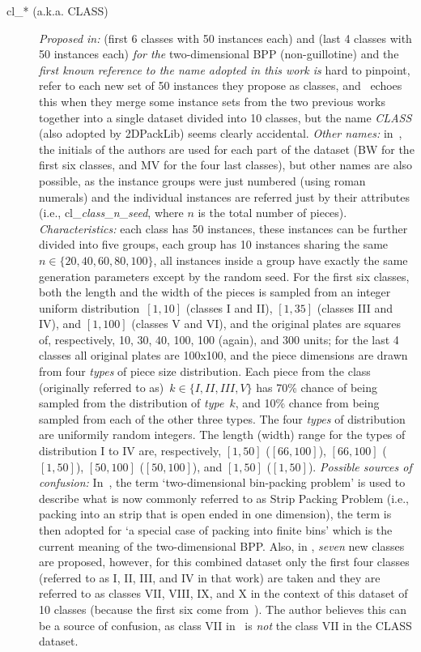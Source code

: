 \documentclass[ppgc,tese,english,formais,babel]{iiufrgs}
\begin{document}
\begin{description}
\item[cl\_* (a.k.a. CLASS)] \emph{Proposed in:} \citet{berkey:1987} (first 6 classes with 50 instances each) and \citet{martello:1998} (last 4 classes with 50 instances each) \emph{for the} two-dimensional BPP (non-guillotine) and the \emph{first known reference to the name adopted in this work is} hard to pinpoint, \citet{martello:1998} refer to each new set of 50 instances they propose as classes, and~\citet{boschetti:2003} echoes this when they merge some instance sets from the two previous works together into a single dataset divided into 10 classes, but the name \emph{CLASS} (also adopted by 2DPackLib) seems clearly accidental. \emph{Other names:} in~\cite{alvelos:2009}, the initials of the authors are used for each part of the dataset (BW for the first six classes, and MV for the four last classes), but other names are also possible, as the instance groups were just numbered (using roman numerals) and the individual instances are referred just by their attributes (i.e., cl\_\emph{class}\_\emph{n}\_\emph{seed}, where \(n\) is the total number of pieces). \emph{Characteristics:} each class has 50 instances, these instances can be further divided into five groups, each group has 10 instances sharing the same~\(n \in \{20, 40, 60, 80, 100\}\), all instances inside a group have exactly the same generation parameters except by the random seed. For the first six classes, both the length and the width of the pieces is sampled from an integer uniform distribution~\([1, 10]\) (classes I and II), \([1, 35]\) (classes III and IV), and \([1, 100]\) (classes V and VI), and the original plates are squares of, respectively, 10, 30, 40, 100, 100 (again), and 300 units; for the last 4 classes all original plates are 100x100, and the piece dimensions are drawn from four \emph{types} of piece size distribution. Each piece from the class (originally referred to as)~\(k \in \{I, II, III, V\}\) has 70\% chance of being sampled from the distribution of \emph{type}~\(k\), and 10\% chance from being sampled from each of the other three types. The four \emph{types} of distribution are uniformily random integers. The length (width) range for the types of distribution I to IV are, respectively, \([1, 50]\) (\([66, 100]\)), \([66, 100]\) (\([1, 50]\)), \([50, 100]\) (\([50, 100]\)), and \([1, 50]\) (\([1, 50]\)). \emph{Possible sources of confusion:} In~\citet{berkey:1987}, the term `two-dimensional bin-packing problem' is used to describe what is now commonly referred to as Strip Packing Problem (i.e., packing into an strip that is open ended in one dimension), the term is then adopted for `a special case of packing into finite bins' which is the current meaning of the two-dimensional BPP. Also, in \citet{martello:1998}, \emph{seven} new classes are proposed, however, for this combined dataset only the first four classes (referred to as I, II, III, and IV in that work) are taken and they are referred to as classes VII, VIII, IX, and X in the context of this dataset of 10 classes (because the first six come from~\citet{berkey:1987}). The author believes this can be a source of confusion, as class VII in~\citet{martello1998} is \emph{not} the class VII in the CLASS dataset.

\end{description}
\end{document}
